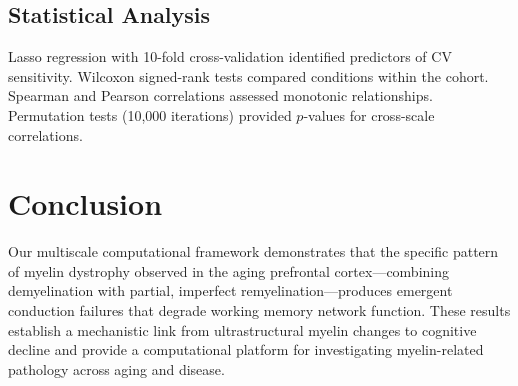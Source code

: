 \documentclass[11pt]{article}
\begin{document}
\subsection{Statistical Analysis}

Lasso regression \citep{tibshirani1996regression} with 10-fold cross-validation identified predictors of CV sensitivity. Wilcoxon signed-rank tests compared conditions within the cohort. Spearman and Pearson correlations assessed monotonic relationships. Permutation tests (10,000 iterations) provided $p$-values for cross-scale correlations.

\section{Conclusion}

Our multiscale computational framework demonstrates that the specific pattern of myelin dystrophy observed in the aging prefrontal cortex---combining demyelination with partial, imperfect remyelination---produces emergent conduction failures that degrade working memory network function. These results establish a mechanistic link from ultrastructural myelin changes to cognitive decline and provide a computational platform for investigating myelin-related pathology across aging and disease.



\end{document}
